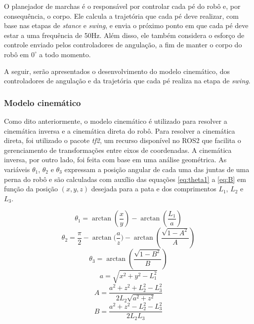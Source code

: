 \documentclass[../main.tex]{subfiles}
\begin{document}
O planejador de marchas é o responsável por controlar cada pé do robô e, por consequência, o corpo. Ele calcula a trajetória que cada pé deve realizar, com base nas etapas de \textit{stance} e \textit{swing}, e envia o próximo ponto em que cada pé deve estar a uma frequência de 50Hz. Além disso, ele também considera o esforço de controle enviado pelos controladores de angulação, a fim de manter o corpo do robô em $0^{\circ}$ a todo momento.

A seguir, serão apresentados o desenvolvimento do modelo cinemático, dos controladores de angulação e da trajetória que cada pé realiza na etapa de \textit{swing}. 

\subsubsection{Modelo cinemático}
\label{sec:detail_inv_kinematics}

Como dito anteriormente, o modelo cinemático é utilizado para resolver a cinemática inversa e a cinemática direta do robô. Para resolver a cinemática direta, foi utilizado o pacote \textit{tf2}, um recurso disponível no ROS2 que facilita o gerenciamento de transformações entre eixos de coordenadas. A cinemática inversa, por outro lado, foi feita com base em uma análise geométrica. As variáveis $\theta_1$, $\theta_2$ e $\theta_3$ expressam a posição angular de cada uma das juntas de uma perna do robô e são calculadas com auxílio das equações \ref{eq:theta1} a \ref{eq:B} em função da posição $(x, y, z)$ desejada para a pata e dos comprimentos $L_1$, $L_2$ e $L_3$.

\begin{equation}
  \label{eq:theta1}
  \theta_1 = \arctan{(\frac{x}{y})} - \arctan{(\frac{L_1}{a})}
\end{equation}
\begin{equation}
  \label{eq:theta2}
  \theta_2 = \frac{\pi}{2} - \arctan{(\frac{a}{z}}) - \arctan{(\frac{\sqrt{1-A^2}}{A})}
\end{equation}
\begin{equation}
  \label{eq:theta3}
  \theta_3 = \arctan(\frac{\sqrt{1-B^2}}{B})
\end{equation}
\begin{equation}
  \label{eq:a}
  a = \sqrt{x^2+y^2-L_1^2}
\end{equation}
\begin{equation}
  \label{eq:A}
  A =\frac{a^2+z^2+L_2^2-L_3^2}{2L_2\sqrt{a^2+z^2}}
\end{equation}
\begin{equation}
  \label{eq:B}
  B = \frac{a^2+z^2-L_2^2-L_3^2}{2L_2L_3}
\end{equation}
\end{document}
